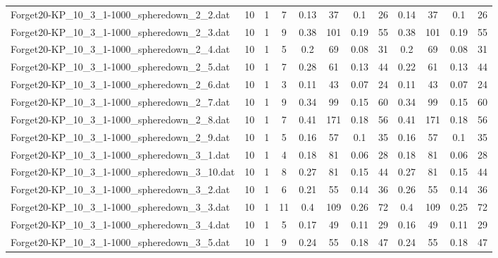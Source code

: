 \begin{sidewaystable}[!ht]
{\begin{tabular}{lccccccccccc}
Forget20-KP\_10\_3\_1-1000\_spheredown\_2\_2.dat & 10 & 1 & 7 & 0.13 & 37 &  \textcolor{blue2}{0.1} & 26 & 0.14 & 37 &  \textcolor{blue2}{0.1} & 26 \\
Forget20-KP\_10\_3\_1-1000\_spheredown\_2\_3.dat & 10 & 1 & 9 & 0.38 & 101 &  \textcolor{blue2}{0.19} & 55 & 0.38 & 101 &  \textcolor{blue2}{0.19} & 55 \\
Forget20-KP\_10\_3\_1-1000\_spheredown\_2\_4.dat & 10 & 1 & 5 & 0.2 & 69 &  \textcolor{blue2}{0.08} & 31 & 0.2 & 69 &  \textcolor{blue2}{0.08} & 31 \\
Forget20-KP\_10\_3\_1-1000\_spheredown\_2\_5.dat & 10 & 1 & 7 & 0.28 & 61 &  \textcolor{blue2}{0.13} & 44 & 0.22 & 61 &  \textcolor{blue2}{0.13} & 44 \\
Forget20-KP\_10\_3\_1-1000\_spheredown\_2\_6.dat & 10 & 1 & 3 & 0.11 & 43 &  \textcolor{blue2}{0.07} & 24 & 0.11 & 43 &  \textcolor{blue2}{0.07} & 24 \\
Forget20-KP\_10\_3\_1-1000\_spheredown\_2\_7.dat & 10 & 1 & 9 & 0.34 & 99 &  \textcolor{blue2}{0.15} & 60 & 0.34 & 99 &  \textcolor{blue2}{0.15} & 60 \\
Forget20-KP\_10\_3\_1-1000\_spheredown\_2\_8.dat & 10 & 1 & 7 & 0.41 & 171 &  \textcolor{blue2}{0.18} & 56 & 0.41 & 171 &  \textcolor{blue2}{0.18} & 56 \\
Forget20-KP\_10\_3\_1-1000\_spheredown\_2\_9.dat & 10 & 1 & 5 & 0.16 & 57 &  \textcolor{blue2}{0.1} & 35 & 0.16 & 57 &  \textcolor{blue2}{0.1} & 35 \\
Forget20-KP\_10\_3\_1-1000\_spheredown\_3\_1.dat & 10 & 1 & 4 & 0.18 & 81 &  \textcolor{blue2}{0.06} & 28 & 0.18 & 81 &  \textcolor{blue2}{0.06} & 28 \\
Forget20-KP\_10\_3\_1-1000\_spheredown\_3\_10.dat & 10 & 1 & 8 & 0.27 & 81 &  \textcolor{blue2}{0.15} & 44 & 0.27 & 81 &  \textcolor{blue2}{0.15} & 44 \\
Forget20-KP\_10\_3\_1-1000\_spheredown\_3\_2.dat & 10 & 1 & 6 & 0.21 & 55 &  \textcolor{blue2}{0.14} & 36 & 0.26 & 55 &  \textcolor{blue2}{0.14} & 36 \\
Forget20-KP\_10\_3\_1-1000\_spheredown\_3\_3.dat & 10 & 1 & 11 & 0.4 & 109 & 0.26 & 72 & 0.4 & 109 &  \textcolor{blue2}{0.25} & 72 \\
Forget20-KP\_10\_3\_1-1000\_spheredown\_3\_4.dat & 10 & 1 & 5 & 0.17 & 49 &  \textcolor{blue2}{0.11} & 29 & 0.16 & 49 &  \textcolor{blue2}{0.11} & 29 \\
Forget20-KP\_10\_3\_1-1000\_spheredown\_3\_5.dat & 10 & 1 & 9 & 0.24 & 55 &  \textcolor{blue2}{0.18} & 47 & 0.24 & 55 &  \textcolor{blue2}{0.18} & 47 \\

\end{tabular}}
\end{sidewaystable}
